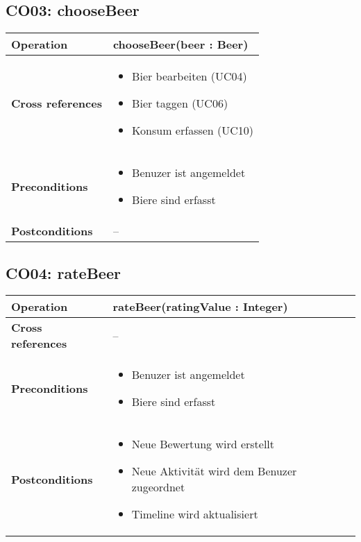 \documentclass[10pt,a4paper]{scrartcl}
\begin{document}
\subsection{CO03: chooseBeer}
\begin{tabular}{|l|p{\textwidth}|}
\hline
 \textbf{Operation} & chooseBeer(beer : Beer) \\ 
\hline
\textbf{Cross references} & \begin{itemize}
								\item Bier bearbeiten (UC04)
								\item Bier taggen (UC06)
								\item Konsum erfassen (UC10)
						    \end{itemize} \\ 
\hline 
\textbf{Preconditions} & \begin{itemize}
							\item Benuzer ist angemeldet
							\item Biere sind erfasst 
						 \end{itemize} \\
\hline 
\textbf{Postconditions} & -- \\
\hline
\end{tabular}

\subsection{CO04: rateBeer}
\begin{tabular}{|l|p{\textwidth}|}
\hline
 \textbf{Operation} & rateBeer(ratingValue : Integer) \\ 
\hline
\textbf{Cross references} & -- \\ 
\hline 
\textbf{Preconditions} & \begin{itemize}
							\item Benuzer ist angemeldet
							\item Biere sind erfasst 
						 \end{itemize}\\
\hline 
\textbf{Postconditions} & \begin{itemize}
							\item Neue Bewertung wird erstellt
							\item Neue Aktivität wird dem Benuzer zugeordnet
							\item Timeline wird aktualisiert 
						  \end{itemize} \\
\hline
\end{tabular}
\end{document}
